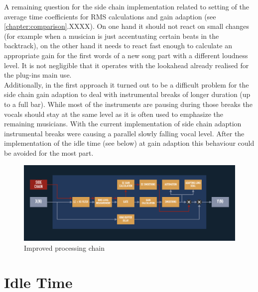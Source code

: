 A remaining question for the side chain implementation related to setting of the average time coefficients for RMS calculations and gain adaption (see \ref{chapter:comparison}.XXXX). On one hand it should not react on small changes (for example when a musician is just accentuating certain beats in the backtrack), on the other hand it needs to react fast enough to calculate an appropriate gain for the first words of a new song part with a different loudness level. It is not negligible that it operates with the lookahead already realised for the plug-ins main use.\\
Additionally, in the first approach it turned out to be a difficult problem for the side chain gain adaption to deal with instrumental breaks of longer duration (up to a full bar). While most of the instruments are pausing during those breaks the vocals should stay at the same level as it is often used to emphasize the remaining musicians. With the current implementation of side chain adaption instrumental breaks were causing a parallel slowly falling vocal level. After the implementation of the idle time (see below) at gain adaption this behaviour could be avoided for the most part.\\

\begin{figure}[H]
\includegraphics[width=\textwidth]{images/chain02}
\caption{Improved processing chain}
\label{Chain2}
\end{figure}

\section{Idle Time}

